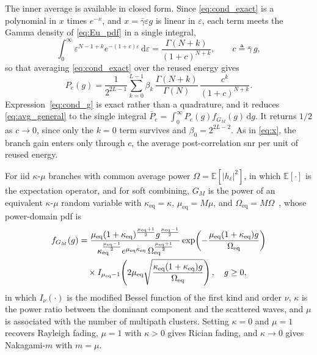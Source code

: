 \documentclass[12pt, draftclsnofoot, onecolumn]{IEEEtran}
\newcommand{\rev}[1]{#1}
\begin{document}
\rev{The inner average is available in closed form. Since \eqref{eq:cond_exact}
is a polynomial in $x$ times $e^{-x}$, and $x=\bar\gamma\varepsilon g$ is linear
in $\varepsilon$, each term meets the Gamma density of \eqref{eq:Eu_pdf} in a
single integral,
\begin{equation*}
\int_0^{\infty}\!\varepsilon^{N-1+k}e^{-(1+c)\varepsilon}\,\mathrm{d}\varepsilon
=\frac{\Gamma(N+k)}{(1+c)^{N+k}},
\qquad c\triangleq\bar\gamma\,g,
\end{equation*}
so that averaging \eqref{eq:cond_exact} over the reused energy gives
\begin{equation}
P_e(g)=\frac{1}{2^{2L-1}}\sum_{k=0}^{L-1}\beta_k\,
\frac{\Gamma(N+k)}{\Gamma(N)}\,\frac{c^{k}}{(1+c)^{N+k}} .
\label{eq:cond_g}
\end{equation}
Expression~\eqref{eq:cond_g} is exact rather than a quadrature, and it reduces
\eqref{eq:avg_general} to the single integral
$\bar P_e=\int_0^{\infty}P_e(g)f_{G_M}(g)\,\mathrm{d}g$. It returns $1/2$ as
$c\to0$, since only the $k=0$ term survives and
$\beta_0=2^{2L-2}$. As in \eqref{eq:x}, the branch gain enters only through $c$,
the average post-correlation \ac{snr} per unit of reused energy.}

For \ac{iid} $\kappa$-$\mu$ branches
with common average power $\Omega=\mathbb{E}[|h_\ell|^2]$, in which
$\mathbb{E}[\cdot]$ is the expectation operator, and for soft combining, $G_M$ is the power of an
equivalent $\kappa$-$\mu$ random variable with $\kappa_{\text{eq}}=\kappa$,
$\mu_{\text{eq}}=M\mu$, and $\Omega_{\text{eq}}=M\Omega$~\cite{Yacoub_2007_kappa},
whose power-domain \ac{pdf} is
\begin{align}
f_{G_M}(g) &= \frac{\mu_{\text{eq}}(1+\kappa_{\text{eq}})^{\frac{\mu_{\text{eq}}+1}{2}}
g^{\frac{\mu_{\text{eq}}-1}{2}}}
{\kappa_{\text{eq}}^{\frac{\mu_{\text{eq}}-1}{2}}
 e^{\mu_{\text{eq}}\kappa_{\text{eq}}}\,\Omega_{\text{eq}}^{\frac{\mu_{\text{eq}}+1}{2}}}
\exp\!\left(-\frac{\mu_{\text{eq}}(1+\kappa_{\text{eq}})g}{\Omega_{\text{eq}}}\right)
\notag\\
&\quad\times I_{\mu_{\text{eq}}-1}\!\left(2\mu_{\text{eq}}
\sqrt{\frac{\kappa_{\text{eq}}(1+\kappa_{\text{eq}})g}{\Omega_{\text{eq}}}}\right),
\quad g\geq 0,
\label{eq:kmu_pdf}
\end{align}
in which $I_\nu(\cdot)$ is the modified Bessel function of the first kind and
order $\nu$, $\kappa$ is the power ratio between the dominant component and the
scattered waves, and $\mu$ is associated with the number of multipath clusters.
Setting $\kappa=0$ and $\mu=1$ recovers Rayleigh fading, $\mu=1$ with $\kappa>0$
gives Rician fading, and $\kappa\to0$ gives Nakagami-$m$ with $m=\mu$. 
\end{document}
